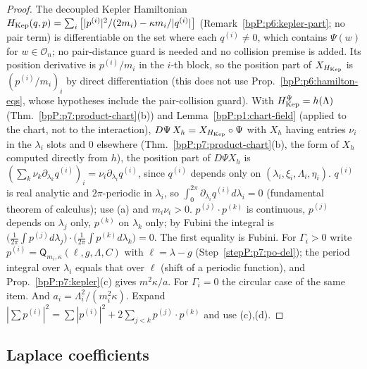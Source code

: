 \begin{proof}
\label{stepP:p8:l64-a} The decoupled Kepler Hamiltonian $H_{\rm Kep}(q,p)=\sum_i\big[|p^{(i)}|^2/(2m_i)-\kappa m_i/|q^{(i)}|\big]$ (Remark~\ref{bpP:p6:kepler-part}; no pair term) is differentiable on the set where each $q^{(i)}\ne0$, which contains $\Psi(w)$ for $w\in\mathcal O_n$; no pair-distance guard is needed and no collision premise is added. Its position derivative is $p^{(i)}/m_i$ in the $i$-th block, so the position part of $X_{H_{\rm Kep}}$ is $(p^{(i)}/m_i)_i$ by direct differentiation (this does not use Prop.~\ref{bpP:p6:hamilton-eqs}, whose hypotheses include the pair-collision guard). With $H_{\rm Kep}^\Psi=h(\Lambda)$ (Thm.~\ref{bpP:p7:product-chart}(b)) and Lemma~\ref{bpP:p1:chart-field} (applied to the chart, not to the interaction), $D\Psi\,X_h=X_{H_{\rm Kep}}\circ\Psi$ with $X_h$ having entries $\nu_i$ in the $\lambda_i$ slots and $0$ elsewhere (Thm.~\ref{bpP:p7:product-chart}(b), the form of $X_h$ computed directly from $h$), the position part of $D\Psi X_h$ is $(\sum_k\nu_k\partial_{\lambda_k}q^{(i)})_i=\nu_i\partial_{\lambda_i}q^{(i)}$, since $q^{(i)}$ depends only on $(\lambda_i,\xi_i,\Lambda_i,\eta_i)$.
\label{stepP:p8:l64-b} $q^{(i)}$ is real analytic and $2\pi$-periodic in $\lambda_i$, so $\int_0^{2\pi}\partial_{\lambda_i}q^{(i)}d\lambda_i=0$ (fundamental theorem of calculus); use (a) and $m_i\nu_i>0$.
\label{stepP:p8:l64-c} $p^{(j)}\cdot p^{(k)}$ is continuous, $p^{(j)}$ depends on $\lambda_j$ only, $p^{(k)}$ on $\lambda_k$ only; by Fubini the integral is $\big(\tfrac1{2\pi}\!\int p^{(j)}d\lambda_j\big)\cdot\big(\tfrac1{2\pi}\!\int p^{(k)}d\lambda_k\big)=0$.
\label{stepP:p8:l64-d} The first equality is Fubini. For $\Gamma_i>0$ write $p^{(i)}=\mathsf Q_{m_i,\kappa}(\ell,g,\Lambda,C)$ with $\ell=\lambda-g$ (Step~\ref{stepP:p7:po-del}); the period integral over $\lambda_i$ equals that over $\ell$ (shift of a periodic function), and Prop.~\ref{bpP:p7:kepler}(c) gives $m^2\kappa/a$. For $\Gamma_i=0$ the circular case of the same item. And $a_i=\Lambda_i^2/(m_i^2\kappa)$.
\label{stepP:p8:l64-e} Expand $|\sum p^{(i)}|^2=\sum|p^{(i)}|^2+2\sum_{j<k}p^{(j)}\cdot p^{(k)}$ and use (c),(d).
\end{proof}

\subsection{Laplace coefficients}\label{bpP:p8:sec-lap}

